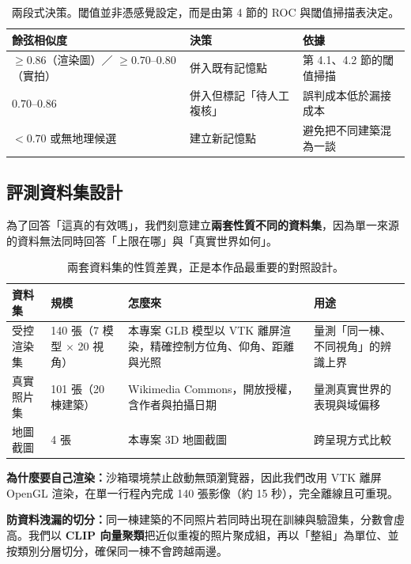 \documentclass[11pt,a4paper,fontset=windows]{ctexart}
\begin{document}
\begin{table}[H]
\centering\small
\begin{tabular}{@{}lll@{}}
\toprule
\textbf{餘弦相似度} & \textbf{決策} & \textbf{依據} \\
\midrule
$\ge 0.86$（渲染圖）／ $\ge 0.70\text{--}0.80$（實拍） & 併入既有記憶點 & 第 4.1、4.2 節的閾值掃描 \\
$0.70\text{--}0.86$ & 併入但標記「待人工複核」 & 誤判成本低於漏接成本 \\
$< 0.70$ 或無地理候選 & 建立新記憶點 & 避免把不同建築混為一談 \\
\bottomrule
\end{tabular}
\caption{兩段式決策。閾值並非憑感覺設定，而是由第 4 節的 ROC 與閾值掃描表決定。}
\label{tab:decision}
\end{table}

\subsection{評測資料集設計}
為了回答「這真的有效嗎」，我們刻意建立\textbf{兩套性質不同的資料集}，因為單一來源的資料無法同時回答「上限在哪」與「真實世界如何」。

\begin{table}[H]
\centering\small
\begin{tabular}{@{}p{2.4cm}p{3.1cm}p{4.4cm}p{4.4cm}@{}}
\toprule
\textbf{資料集} & \textbf{規模} & \textbf{怎麼來} & \textbf{用途} \\
\midrule
受控渲染集 & 140 張（7 模型 $\times$ 20 視角） & 本專案 GLB 模型以 VTK 離屏渲染，精確控制方位角、仰角、距離與光照 & 量測「同一棟、不同視角」的辨識上界 \\
真實照片集 & 101 張（20 棟建築） & Wikimedia Commons，開放授權，含作者與拍攝日期 & 量測真實世界的表現與域偏移 \\
地圖截圖 & 4 張 & 本專案 3D 地圖截圖 & 跨呈現方式比較 \\
\bottomrule
\end{tabular}
\caption{兩套資料集的性質差異，正是本作品最重要的對照設計。}
\end{table}

\noindent\textbf{為什麼要自己渲染：}沙箱環境禁止啟動無頭瀏覽器，因此我們改用 VTK 離屏 OpenGL 渲染，在單一行程內完成 140 張影像（約 15 秒），完全離線且可重現。

\noindent\textbf{防資料洩漏的切分：}同一棟建築的不同照片若同時出現在訓練與驗證集，分數會虛高。我們以 \textbf{CLIP 向量聚類}把近似重複的照片聚成組，再以「整組」為單位、並按類別分層切分，確保同一棟不會跨越兩邊。
\end{document}
